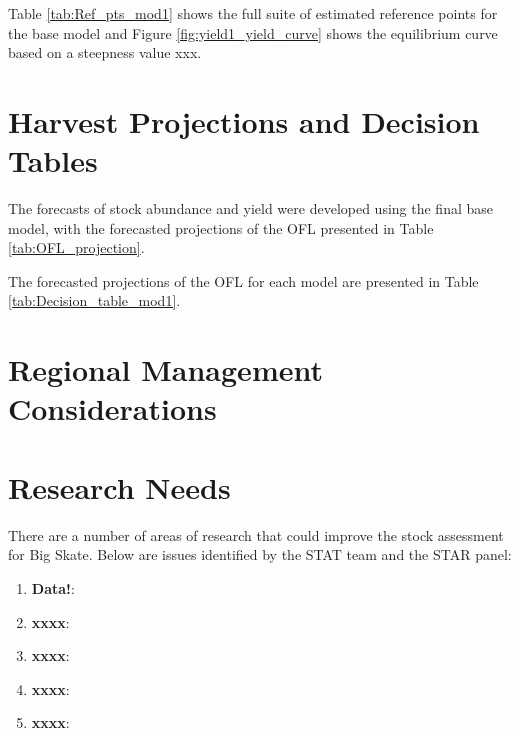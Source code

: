 \documentclass[12pt,]{article}
\begin{document}
Table \ref{tab:Ref_pts_mod1} shows the full suite of estimated reference
points for the base model and Figure \ref{fig:yield1_yield_curve} shows
the equilibrium curve based on a steepness value xxx.

\newpage

\hypertarget{harvest-projections-and-decision-tables}{%
\section{Harvest Projections and Decision
Tables}\label{harvest-projections-and-decision-tables}}

The forecasts of stock abundance and yield were developed using the
final base model, with the forecasted projections of the OFL presented
in Table \ref{tab:OFL_projection}.

The forecasted projections of the OFL for each model are presented in
Table \ref{tab:Decision_table_mod1}.

\newpage

\hypertarget{regional-management-considerations}{%
\section{Regional Management
Considerations}\label{regional-management-considerations}}

\newpage

\hypertarget{research-needs}{%
\section{Research Needs}\label{research-needs}}

There are a number of areas of research that could improve the stock
assessment for Big Skate. Below are issues identified by the STAT team
and the STAR panel:

\begin{enumerate}

\item \textbf{Data!}: 

\item \textbf{xxxx}:

\item \textbf{xxxx}:

\item \textbf{xxxx}:

\item \textbf{xxxx}:

\end{enumerate}
\end{document}
